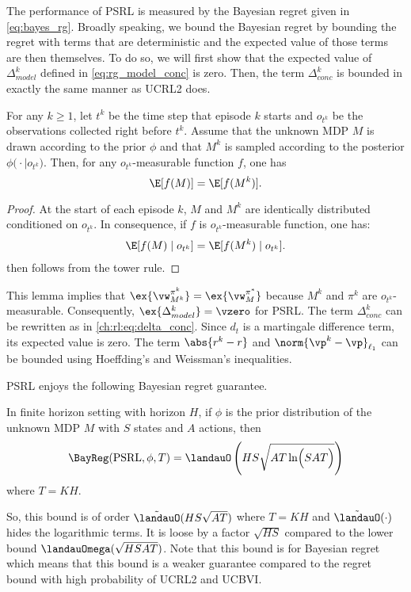 The performance of PSRL is measured by the Bayesian regret given in \eqref{eq:bayes_rg}.
Broadly speaking, we bound the Bayesian regret by bounding the regret with terms that are deterministic and the expected value of those terms are then themselves.
To do so, we will first show that the expected value of $\Delta^k_{model}$ defined in \eqref{eq:rg_model_conc} is zero.
Then, the term $\Delta^k_{conc}$ is bounded in exactly the same manner as UCRL2 does.
\begin{lem}
    \label{lem:expected_identity}
    For any $k\ge1$, let $t^k$ be the time step that episode $k$ starts and $o_{t^k}$ be the observations collected right before $t^k$.
    Assume that the unknown MDP $M$ is drawn according to the prior $\phi$ and that $M^k$ is sampled according to the posterior $\phi\bigl(\cdot\mid o_{t^k}\bigr)$. Then, for any $o_{t^k}$-measurable function $f$, one has
    \begin{equation}
        \label{eq:exp_iden}
        \E[f(M)] =\E[f(M^k)].
    \end{equation}
\end{lem}
\begin{proof}
    At the start of each episode $k$, $M$ and $M^k$ are identically distributed conditioned on $o_{t^k}$.
    In consequence, if $f$ is $o_{t^k}$-measurable function, one has:
    \begin{align*}    
        \E[f(M) \mid o_{t^k}] =\E[f(M^k) \mid o_{t^k}].
    \end{align*}
     then follows from the tower rule.
\end{proof}
This lemma implies that $\ex{\vw^{\pi^k}_{M^k}}=\ex{\vw^{\pi^*}_M}$ because $M^k$ and $\pi^k$ are $o_{t^k}$-measurable.
Consequently, $\ex{\Delta^k_{model}}=\vzero$ for PSRL.
The term $\Delta^k_{conc}$ can be rewritten as in \eqref{ch:rl:eq:delta_conc}.
Since $d_t$ is a martingale difference term, its expected value is zero.
The term $\abs{r^k-r}$ and $\norm{\vp^k-\vp}_{\ell_1}$ can be bounded using Hoeffding's and Weissman's inequalities.

PSRL enjoys the following Bayesian regret guarantee.
\begin{prop}
    \label{prop:brg_psrl}
    In finite horizon setting with horizon $H$, if $\phi$ is the prior distribution of the unknown MDP $M$ with $S$ states and $A$ actions, then
    \begin{equation}
        \label{eq:brg_psrl}
        \BayReg(\textnormal{PSRL}, \phi, T) = \landauO\left(HS\sqrt{AT\ln\Bigl(SAT\Bigr)}\right)
    \end{equation}
    where $T=KH$.
\end{prop}
So, this bound is of order $\tilde{\landauO}(HS\sqrt{AT})$ where $T=KH$ and $\tilde{\landauO}(\cdot)$ hides the logarithmic terms.
It is loose by a factor $\sqrt{HS}$ compared to the lower bound $\landauOmega(\sqrt{HSAT})$.
Note that this bound is for Bayesian regret which means that this bound is a weaker guarantee compared to the regret bound with high probability of UCRL2 and UCBVI.

\endgroup
